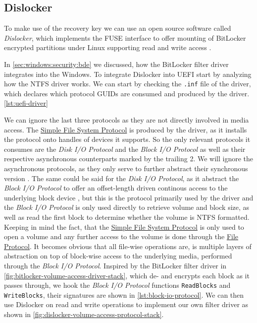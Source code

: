 \subsection{Dislocker}

To make use of the recovery key we can use an open source software called \emph{Dislocker}, which implements the \ac{FUSE} interface to offer mounting of BitLocker encrypted partitions under Linux supporting read and write access \cite{dislocker}.

In \autoref{sec:windows:security:bde} we discussed, how the BitLocker filter driver integrates into the Windows.
To integrate Dislocker into \ac{UEFI} start by analyzing how the \ac{NTFS} driver works.
We can start by checking the \lstinline{.inf} file of the driver, which declares which protocol \acp{GUID} are consumed and produced by the driver. \autoref{lst:uefi-driver}



We can ignore the last three protocols as they are not directly involved in media access.
The \hyperref[lst:simple-file-system-protocol]{Simple File System Protocol} is produced by the driver, as it installs the protocol onto handles of devices it supports.
So the only relevant protocols it consumes are the \emph{Disk \ac{I/O} Protocol} and the \emph{Block \ac{I/O} Protocol} as well as their respective asynchronous counterparts marked by the trailing 2.
We will ignore the asynchronous protocols, as they only serve to further abstract their synchronous version \cite[Sections 13.8 and 13.10]{uefi-spec}.
The same could be said for the \emph{Disk \ac{I/O} Protocol}, as it abstract the \emph{Block \ac{I/O} Protocol} to offer an offset-length driven continous access to the underlying block device \cite[Section 13.7]{uefi-spec}, but this is the protocol primarily used by the driver and the \emph{Block \ac{I/O} Protocol} is only used directly to retrieve volume and block size, as well as read the first block to determine whether the volume is \ac{NTFS} formatted.
Keeping in mind the fact, that the \hyperref[lst:simple-file-system-protocol]{Simple File System Protocol} is only used to open a volume and any further access to the volume is done through the \hyperref[lst:simple-file-system-protocol]{File Protocol}.
It becomes obvious that all file-wise operations are, is multiple layers of abstraction on top of block-wise access to the underlying media, performed through the \emph{Block \ac{I/O} Protocol}.
Inspired by the BitLocker filter driver in \autoref{fig:bitlocker-volume-access-driver-stack}, which de- and encrypts each block as it passes through, we hook the \emph{Block \ac{I/O} Protocol} functions \lstinline{ReadBlocks} and \lstinline{WriteBlocks}, their signatures are shown in \autoref{lst:block-io-protocol}.
We can then use Dislocker on read and write operations to implement our own filter driver as shown in \autoref{fig:dislocker-volume-access-protocol-stack}.


